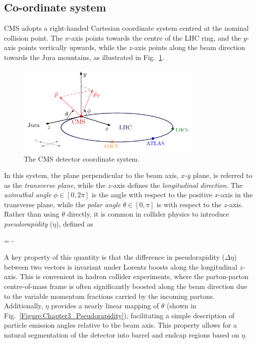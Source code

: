 \subsection{Co-ordinate system}
\ac{CMS} adopts a right-handed Cartesian coordinate system centred at the nominal collision point. The $x$-axis points towards the centre of the \ac{LHC} ring, and the $y$-axis points vertically upwards, while the $z$-axis points along the beam direction towards the Jura mountains, as illustrated in Fig.~\ref{Figure:Chapter3_CMS_CoordinateSystem}.

\begin{figure}[!htbp]
\centering
\includegraphics[width= 0.8\textwidth]{Figures/Chapter3/CMS_CoordinateSystem.pdf}
\caption{The CMS detector coordinate system.}
\label{Figure:Chapter3_CMS_CoordinateSystem}
\end{figure}

In this system, the plane perpendicular to the beam axis, $x$-$y$ plane, is referred to as the \textit{transverse plane}, while the $z$-axis defines the \textit{longitudinal direction}. The \textit{azimuthal angle} $\phi \in [0,2\pi]$ is the angle with respect to the positive $x$-axis in the transverse plane, while the \textit{polar angle} $\theta \in [0,\pi]$ is with respect to the $z$-axis. Rather than using $\theta$ directly, it is common in collider physics to introduce \textit{pseudorapidity} ($\eta$), defined as

\begin{equation_pad}
    \eta = - \ln{}
\end{equation_pad}

A key property of this quantity is that the difference in pseudorapidity ($\Delta\eta$) between two vectors is invariant under Lorentz boosts along the longitudinal $z$-axis. This is convenient in hadron collider experiments, where the parton-parton centre-of-mass frame is often significantly boosted along the beam direction due to the variable momentum fractions carried by the incoming partons. Additionally, $\eta$ provides a nearly linear mapping of $\theta$ (shown in Fig.~\ref{Figure:Chapter3_Pseudorapidity}), facilitating a simple description of particle emission angles relative to the beam axis. This property allows for a natural segmentation of the detector into barrel and endcap regions based on $\eta$.

